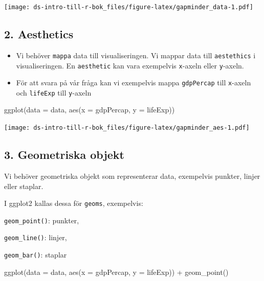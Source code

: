 \documentclass[
]{book}
\newenvironment{Shaded}{\begin{snugshade}}{\end{snugshade}}
\newcommand{\AttributeTok}[1]{\textcolor[rgb]{0.77,0.63,0.00}{#1}}
\newcommand{\FunctionTok}[1]{\textcolor[rgb]{0.00,0.00,0.00}{#1}}
\newcommand{\NormalTok}[1]{#1}
\newcommand{\SpecialCharTok}[1]{\textcolor[rgb]{0.00,0.00,0.00}{#1}}
\begin{document}
\texttt{[image: ds-intro-till-r-bok\_files/figure-latex/gapminder\_data-1.pdf]}

\hypertarget{aesthetics}{%
\subsection{2. Aesthetics}\label{aesthetics}}

\begin{itemize}
\item
  Vi behöver \texttt{mappa} data till visualiseringen. Vi mappar data till \texttt{aestethics} i visualiseringen. En \texttt{aesthetic} kan vara exempelvis \texttt{x}-axeln eller \texttt{y}-axeln.
\item
  För att svara på vår fråga kan vi exempelvis mappa \texttt{gdpPercap} till \texttt{x}-axeln och \texttt{lifeExp} till \texttt{y}-axeln
\end{itemize}

\begin{Shaded}
\begin{Highlighting}[]
\FunctionTok{ggplot}\NormalTok{(}\AttributeTok{data =}\NormalTok{ data, }\FunctionTok{aes}\NormalTok{(}\AttributeTok{x =}\NormalTok{ gdpPercap, }\AttributeTok{y =}\NormalTok{ lifeExp))}
\end{Highlighting}
\end{Shaded}

\texttt{[image: ds-intro-till-r-bok\_files/figure-latex/gapminder\_aes-1.pdf]}

\hypertarget{geometriska-objekt}{%
\subsection{3. Geometriska objekt}\label{geometriska-objekt}}

Vi behöver geometriska objekt som representerar data, exempelvis punkter, linjer eller staplar.

I ggplot2 kallas dessa för \texttt{geoms}, exempelvis:

\texttt{geom\_point()}: punkter,

\texttt{geom\_line()}: linjer,

\texttt{geom\_bar()}: staplar

\begin{Shaded}
\begin{Highlighting}[]
\FunctionTok{ggplot}\NormalTok{(}\AttributeTok{data =}\NormalTok{ data, }\FunctionTok{aes}\NormalTok{(}\AttributeTok{x =}\NormalTok{ gdpPercap, }\AttributeTok{y =}\NormalTok{ lifeExp)) }\SpecialCharTok{+}
  \FunctionTok{geom\_point}\NormalTok{()}
\end{Highlighting}
\end{Shaded}
\end{document}
